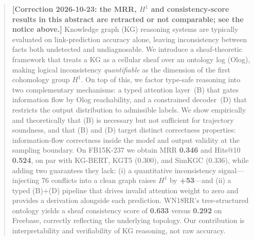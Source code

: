 \begin{abstract}
\textbf{[Correction 2026-10-23: the MRR, $H^1$ and consistency-score results in this abstract are retracted or not comparable; see the notice above.]}
Knowledge graph (KG) reasoning systems are typically evaluated on link-prediction
accuracy alone, leaving inconsistency between facts both undetected and
undiagnosable. We introduce a sheaf-theoretic framework that treats a KG as a
cellular sheaf over an ontology log (Olog), making logical inconsistency
\emph{quantifiable} as the dimension of the first cohomology group $H^1$.
On top of this, we factor type-safe reasoning into two complementary
mechanisms: a typed attention layer~(B) that gates information flow by Olog
reachability, and a constrained decoder~(D) that restricts the output
distribution to admissible labels. We show empirically and theoretically
that (B) is necessary but not sufficient for trajectory soundness, and that
(B) and (D) target distinct correctness properties: information-flow
correctness inside the model and output validity at the sampling boundary.
On FB15K-237 we obtain MRR \textbf{0.346} and Hits@10 \textbf{0.524}, on
par with KG-BERT, KGT5 ($0.300$), and SimKGC ($0.336$), while adding two
guarantees they lack: (i) a quantitative inconsistency signal---injecting
76 conflicts into a clean graph raises $H^1$ by \textbf{+53}---and (ii) a
typed (B)+(D) pipeline that drives invalid attention weight to zero and
provides a derivation alongside each prediction. WN18RR's tree-structured
ontology yields a sheaf consistency score of \textbf{0.633} versus
\textbf{0.292} on Freebase, correctly reflecting the underlying topology.
Our contribution is interpretability and verifiability of KG reasoning,
not raw accuracy.
\end{abstract}
